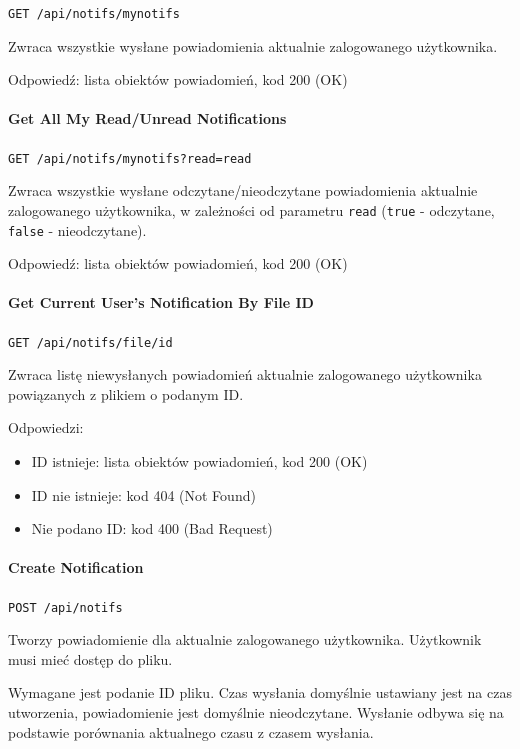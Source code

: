 \documentclass[a4paper,twoside,12pt]{book}
\begin{document}
\texttt{GET /api/notifs/mynotifs}

Zwraca wszystkie wysłane powiadomienia aktualnie zalogowanego użytkownika.

Odpowiedź: lista obiektów powiadomień, kod 200 (OK)

\paragraph{Get All My Read/Unread Notifications}

\texttt{GET /api/notifs/mynotifs?read={read}}

Zwraca wszystkie wysłane odczytane/nieodczytane powiadomienia aktualnie zalogowanego użytkownika, w zależności od parametru \texttt{read} (\texttt{true} - odczytane, \texttt{false} - nieodczytane).

Odpowiedź: lista obiektów powiadomień, kod 200 (OK)

\paragraph{Get Current User's Notification By File ID}

\texttt{GET /api/notifs/file/{id}}

Zwraca listę niewysłanych powiadomień aktualnie zalogowanego użytkownika powiązanych z plikiem o podanym ID.

Odpowiedzi: 
\begin{itemize}
	\item ID istnieje: lista obiektów powiadomień, kod 200 (OK) 
	\item ID nie istnieje: kod 404 (Not Found) 
	\item Nie podano ID: kod 400 (Bad Request)
\end{itemize}

\paragraph{Create Notification}

\texttt{POST /api/notifs}

Tworzy powiadomienie dla aktualnie zalogowanego użytkownika. Użytkownik musi mieć dostęp do pliku.

Wymagane jest podanie ID pliku. Czas wysłania domyślnie ustawiany jest na czas utworzenia, powiadomienie jest domyślnie nieodczytane. Wysłanie odbywa się na podstawie porównania aktualnego czasu z czasem wysłania.
\end{document}
